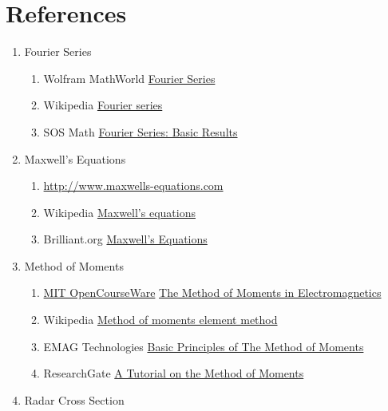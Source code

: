 % 

\section{References}
\begin{enumerate}
	\item Fourier Series
	\begin{enumerate}
		\item Wolfram MathWorld \href{https://mathworld.wolfram.com/FourierSeries.html}{Fourier Series}
		\item Wikipedia \href{https://en.wikipedia.org/wiki/Fourier_series}{Fourier series}
		\item SOS Math \href{http://www.sosmath.com/fourier/fourier1/fourier1.html}{Fourier Series: Basic Results}
	\end{enumerate}
	\item Maxwell's Equations
	\begin{enumerate}
		\item \href{http://www.maxwells-equations.com}{http://www.maxwells-equations.com}
		\item Wikipedia \href{https://en.wikipedia.org/wiki/Maxwell\%27s\_equations}{Maxwell's equations}
		\item Brilliant.org \href{https://brilliant.org/wiki/maxwells-equations/#}{Maxwell's Equations}
	\end{enumerate}
	\item Method of Moments
	\begin{enumerate}
		\item \href{https://ocw.mit.edu/index.htm}{MIT OpenCourseWare} \href{https://ocw.mit.edu/courses/electrical-engineering-and-computer-science/6-635-advanced-electromagnetism-spring-2003/lecture-notes/Mar10.pdf}{The Method of Moments in Electromagnetics}
		\item Wikipedia \href{https://en.wikipedia.org/wiki/Computational_electromagnetics#Method_of_moments_element_method}{Method of moments element method}
		\item EMAG Technologies \href{http://www.emagtech.com/wiki/index.php/Basic_Principles_of_The_Method_of_Moments}{Basic Principles of The Method of Moments}
		\item ResearchGate \href{https://www.researchgate.net/publication/260515353_A_Tutorial_on_the_Method_of_Moments}{A Tutorial on the Method of Moments}
	\end{enumerate}
	\item Radar Cross Section

\end{enumerate}
